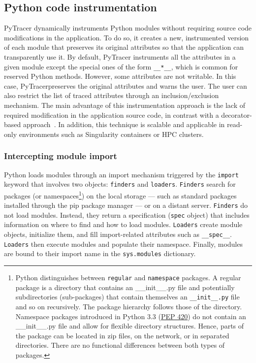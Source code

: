 \documentclass[10pt,journal,compsoc]{IEEEtran}
\newcommand{\pytracer}[0]{PyTracer\xspace}
\DeclareRobustCommand{\add}[1]{\textcolor{ao(english)}{#1}}%
\DeclareRobustCommand{\remove}[1]{}
\DeclareRobustCommand{\add}[1]{#1}
\DeclareRobustCommand{\remove}[1]{}
\begin{document}
\subsection{Python code instrumentation}



\pytracer dynamically instruments Python modules without requiring source code
modifications in the application. To do so, it creates a new, instrumented
version of each module that preserves its original attributes so that the
application can transparently use it.
By default, \pytracer instruments all the attributes in a given module except
the special ones of the form \texttt{\_\_*\_\_}, which is common for reserved
Python methods. However, some attributes are not writable. In this case,
\pytracer \add{preserves} the original attributes and warns
the user. The user can also restrict the list of traced attributes through an
inclusion/exclusion mechanism. The main advantage of this instrumentation
approach is the lack of required modification in the application source code, in
contrast with \remove{decorator-based approaches} \add{a decorator-based
    approach~\mbox{\cite{hunt2019decorators}}}. In addition, this technique is
scalable and applicable in read-only environments such as Singularity containers
or HPC clusters.

\subsubsection{Intercepting module import}

Python loads modules through an import mechanism triggered by the
\texttt{import} keyword that involves two objects: \texttt{finders} and
\texttt{loaders}. \texttt{Finders} search for packages (or
namespaces\footnote{Python distinguishes between \texttt{regular} and
    \texttt{namespace} packages. A regular package is a directory that contains an
    \_\_init\_\_.py file and potentially subdirectories (sub-packages) that contain
    themselves an \texttt{\_\_init\_\_.py} file and so on recursively. The package
    hierarchy follows those of the directory. Namespace packages introduced in
    Python 3.3 (\href{https://www.python.org/dev/peps/pep-0420/}{PEP 420}) do not
    contain an \_\_init\_\_.py file and allow for flexible directory structures.
    Hence, parts of the package can be located in zip files, on the network, or in
    separated directories. There are no functional differences between both types of
    packages.}) on the local storage --- such as standard packages installed through
the pip package manager --- or on a distant server. \texttt{Finders} do not load
modules. Instead, they return a specification (\texttt{spec} object) that
includes information on where to find and how to load modules. \texttt{Loaders}
create module objects, initialize them, and fill import-related attributes such
as \texttt{\_\_spec\_\_}. \texttt{Loaders} then execute modules and populate
their namespace. Finally, modules are bound to their import name in the
\texttt{sys.modules} dictionary.
\end{document}
